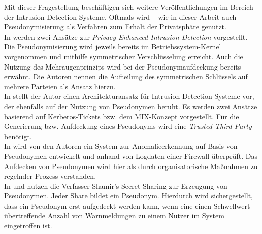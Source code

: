 
Mit dieser Fragestellung beschäftigen sich weitere Veröffentlichungen im Bereich der Intrusion-Detection-Systeme. Oftmals wird -- wie in dieser Arbeit auch -- Pseudonymisierung als Verfahren zum Erhalt der Privatsphäre genutzt.\\
In \cite{sobirey1997pseudonymous} werden zwei Ansätze zur \textit{Privacy Enhanced Intrusion Detection} vorgestellt. Die Pseudonymisierung wird jeweils bereits im Betriebssystem-Kernel vorgenommen und mithilfe symmetrischer Verschlüsselung erreicht. Auch die Nutzung des Mehraugenprinzips wird bei der Pseudonymaufdeckung bereits erwähnt. Die Autoren nennen die Aufteilung des symmetrischen Schlüssels auf mehrere Parteien als Ansatz hierzu.\\
In \cite{buschkes1999privacy} stellt der Autor einen Architekturansatz für Intrusion-Detection-Systeme vor, der ebenfalls auf der Nutzung von Pseudonymen beruht. Es werden zwei Ansätze basierend auf Kerberos-Tickets bzw. dem MIX-Konzept vorgestellt. Für die Generierung bzw. Aufdeckung eines Pseudonyms wird eine \textit{Trusted Third Party} benötigt.\\
In \cite{lundin2000anomaly} wird von den Autoren ein System zur Anomalieerkennung auf Basis von Pseudonymen entwickelt und anhand von Logdaten einer Firewall überprüft. Das Aufdecken von Pseudonymen wird hier als durch organisatorische Maßnahmen zu regelnder Prozess verstanden.\\
In \cite{biskup2000threshold} und \cite{biskup2001pseudonymization} nutzen die Verfasser Shamir's Secret Sharing zur Erzeugung von Pseudonymen. Jeder Share bildet ein Pseudonym. Hierdurch wird sichergestellt, dass ein Pseudonym erst aufgedeckt werden kann, wenn eine einen Schwellwert übertreffende Anzahl von Warnmeldungen zu einem Nutzer im System eingetroffen ist.



